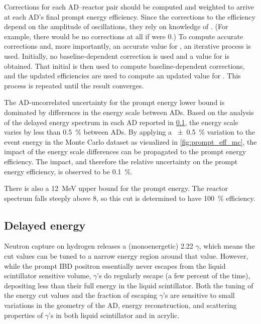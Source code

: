 Corrections for each AD--reactor pair should be computed
and weighted to arrive at each AD's final prompt energy efficiency.
Since the corrections to the efficiency depend on
the amplitude of \nuebar{} oscillations, they rely on knowledge of \thetaot.
(For example, there would be no corrections at all if \thetaot{} were $0$.)
To compute accurate corrections and, more importantly, an accurate value
for \thetaot{}, an iterative process is used.
Initially, no baseline-dependent correction is used and
a value for \thetaot{} is obtained.
That initial \thetaot{} is then used to compute baseline-dependent corrections,
and the updated efficiencies are used to compute an updated value for \thetaot{}.
This process is repeated until the \thetaot{} result converges.

The AD-uncorrelated uncertainty for the prompt energy lower bound
is dominated by differences in the energy scale between ADs.
Based on the analysis of the delayed energy spectrum in each AD
reported in \cref{subsec:delayed}, the energy scale
varies by less than \SI{0.5}{\percent} between ADs.
By applying a \SI{+-0.5}{\percent} variation to
the event energy in the Monte Carlo dataset as visualized in \cref{fig:prompt_eff_mc},
the impact of the energy scale differences can be propagated
to the prompt energy efficiency.
The impact, and therefore the relative uncertainty on
the prompt energy efficiency, is observed to be \SI{0.1}{\percent}.

There is also a \SI{12}{\mega\electronvolt} upper bound for the prompt energy.
The reactor \nuebar{} spectrum falls steeply above \SI{8}{\mev},
so this cut is determined to have \SI{100}{\percent} efficiency.

\subsection{Delayed energy}
\label{subsec:delayed}

Neutron capture on hydrogen releases a (monoenergetic)
\SI{2.22}{\mev} $\gamma$,
which means the cut values can be tuned to a narrow energy region
around that value.
However, while the prompt IBD positron essentially never escapes
from the liquid scintillator sensitive volume,
$\gamma$'s do regularly escape (a few percent of the time),
depositing less than their full energy in the liquid scintillator.
Both the tuning of the energy cut values
and the fraction of escaping $\gamma$'s are sensitive to
small variations in the geometry of the AD, energy reconstruction,
and scattering properties of $\gamma$'s in
both liquid scintillator and in acrylic.

